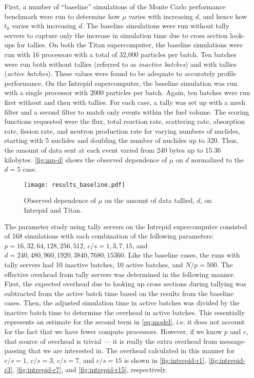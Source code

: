 \documentclass[3p]{elsarticle}
\begin{document}
First, a number of ``baseline'' simulations of the Monte Carlo performance
benchmark were run to determine how $\mu$ varies with increasing $d$, and hence
how $t_0$ varies with increasing $d$. The baseline simulations were run without
tally servers to capture only the increase in simulation time due to cross
section look-ups for tallies. On both the Titan supercomputer, the baseline
simulations were run with 16 processors with a total of 32,000 particles per
batch. Ten batches were run both without tallies (referred to as \emph{inactive
  batches}) and with tallies (\emph{active batches}). These values were found to
be adequate to accurately profile performance. On the Intrepid supercomputer,
the baseline simulation was run with a single processor with 2000 particles per
batch. Again, ten batches were run first without and then with tallies. For each
case, a tally was set up with a mesh filter and a second filter to match only
events within the fuel volume. The scoring functions requested were the flux,
total reaction rate, scattering rate, absorption rate, fission rate, and neutron
production rate for varying numbers of nuclides, starting with 5 nuclides and
doubling the number of nuclides up to 320. Thus, the amount of data sent at each
event varied from 240 bytes up to 15.36 kilobytes. \autoref{fig:mu-d} shows the
observed dependence of $\mu$ on $d$ normalized to the $d=5$ case.

\begin{figure}
  \centering
  \texttt{[image: results\_baseline.pdf]}
  \caption{Observed dependence of $\mu$ on the amount of data tallied, $d$, on
    Intrepid and Titan.}
  \label{fig:mu-d}
\end{figure}

The parameter study using tally servers on the Intrepid supercomputer consisted
of 168 simulations with each combination of the following parameters: $p =
16,32,64,128,256,512$, $c/s = 1,3,7,15$, and $d = 240, 480, 960, \allowbreak
1920, 3840, 7680, 15360$. Like the baseline cases, the runs with tally servers
had 10 inactive batches, 10 active batches, and $N/p = 500$. The effective
overhead from tally servers was determined in the following manner. First, the
expected overhead due to looking up cross sections during tallying was
subtracted from the active batch time based on the results from the baseline
cases. Then, the adjusted simulation time in active batches was divided by the
inactive batch time to determine the overhead in active batches. This
essentially represents an estimate for the second term in \eqref{eq:model},
i.e. it does not account for the fact that we have fewer compute
processors. However, if we know $p$ and $c$, that source of overhead is trivial
--- it is really the extra overhead from message-passing that we are interested
in. The overhead calculated in this manner for $c/s = 1$, $c/s = 3$, $c/s = 7$,
and $c/s = 15$ is shown in \autoref{fig:intrepid-r1}, \autoref{fig:intrepid-r3},
\autoref{fig:intrepid-r7}, and \autoref{fig:intrepid-r15}, respectively.
\end{document}
